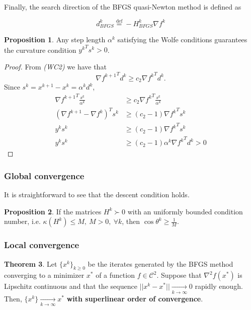 \documentclass[a4paper, 10pt, twocolumn]{article}
\theoremstyle{definition}
\newtheorem{theorem}{Theorem}
\newtheorem{prop}[theorem]{Proposition}
\theoremstyle{remark}
\newcommand{\al}{\alpha}
\newcommand{\C}{\mathcal{C}}
\begin{document}
Finally, the search direction of the BFGS quasi-Newton method is defined as

$$
\boxed{d^k_{BFGS} \overset{\text{def}}{=} -H^{k}_{BFGS}\nabla f^k}
$$

\begin{prop}
Any step length $\al^k$ satisfying the Wolfe conditions guarantees the curvature condition ${y^k}^Ts^k > 0$.
\begin{proof}
From \textit{(WC2)} we have that
$$
{\nabla f^{k+1}}^Td^k \geq c_2{\nabla f^k}^Td^k.
$$
Since $s^k = x^{k+1}-x^k = \al^k d^k$,
\begin{align*}
{\nabla f^{k+1}}^T\frac{s^k}{\al^k} &\geq c_2{\nabla f^k}^T\frac{s^k}{\al^k}\\
(\nabla f^{k+1} - \nabla f^k)^Ts^k &\geq (c_2-1){\nabla f^k}^Ts^k\\
y^ks^k &\geq (c_2-1){\nabla f^k}^Ts^k\\
y^ks^k &\geq (c_2-1)\al^k{{\nabla f^k}^Td^k} > 0
\end{align*}
\end{proof}
\end{prop}

\subsubsection*{Global convergence}

It is straightforward to see that the descent condition holds.

\begin{prop}
If the matrices $H^k \succ 0$ with an uniformly bounded condition number, i.e. $\kappa(H^k) \leq M, \ M > 0, \ \forall k$, then $\cos\theta^k \geq \frac{1}{M}$.
\end{prop}

\subsubsection*{Local convergence}

\begin{theorem}
Let $\{x^k\}_{k\geq 0}$ be the iterates generated by the BFGS method converging to a minimizer $x^*$ of a function $f \in\C^2$. Suppose that $\nabla^2 f(x^*)$ is Lipschitz continuous and that the sequence $||x^k - x^* || \underset{k\rightarrow\infty}{\longrightarrow}0$ rapidly enough. Then, $\{x^k\}\underset{k\rightarrow\infty}{\longrightarrow}x^*$ \textbf{with superlinear order of convergence}.
\end{theorem}
\end{document}

